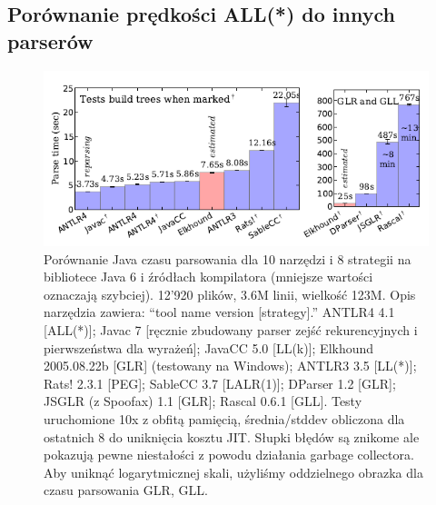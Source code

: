 ﻿\subsection{Porównanie prędkości ALL(*) do innych parserów}
\begin{figure}[h]
\includegraphics[scale=0.67]{Figure9.png}
\caption{
Porównanie Java czasu parsowania dla 10 narzędzi i 8 strategii na
bibliotece Java 6 i źródłach kompilatora (mniejsze wartości oznaczają szybciej).
12'920 plików, 3.6M linii, wielkość 123M.
Opis narzędzia zawiera: “tool name version [strategy].” ANTLR4 4.1 [ALL(*)]; Javac
7 [ręcznie zbudowany parser zejść rekurencyjnych i pierwszeństwa dla wyrażeń];
JavaCC 5.0 [LL(k)]; Elkhound 2005.08.22b [GLR] (testowany na Windows); ANTLR3 3.5 [LL(*)];
Rats! 2.3.1 [PEG]; SableCC 3.7
[LALR(1)]; DParser 1.2 [GLR]; JSGLR (z Spoofax) 1.1 [GLR];
Rascal 0.6.1 [GLL]. Testy uruchomione 10x z obfitą pamięcią, średnia/stddev
obliczona dla ostatnich 8 do uniknięcia kosztu JIT. Słupki błędów są znikome
ale pokazują pewne niestałości z powodu działania garbage collectora.
Aby uniknąć logarytmicznej skali, użyliśmy oddzielnego obrazka dla czasu parsowania GLR, GLL.
}
\end{figure}

